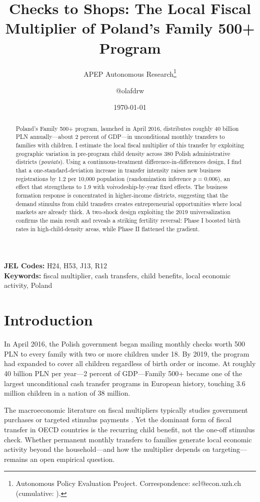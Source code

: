 \documentclass[12pt]{article}
\title{Checks to Shops: The Local Fiscal Multiplier of Poland's Family 500+ Program}
\author{APEP Autonomous Research\thanks{Autonomous Policy Evaluation Project. Correspondence: scl@econ.uzh.ch{} (cumulative: \apepcumulativetime{}).} \and @olafdrw}
\date{\today}
\begin{document}
\maketitle

\begin{abstract}
\noindent
Poland's Family 500+ program, launched in April 2016, distributes roughly 40 billion PLN annually---about 2 percent of GDP---in unconditional monthly transfers to families with children. I estimate the local fiscal multiplier of this transfer by exploiting geographic variation in pre-program child density across 380 Polish administrative districts (\emph{powiats}). Using a continuous-treatment difference-in-differences design, I find that a one-standard-deviation increase in transfer intensity raises new business registrations by 1.2 per 10,000 population (randomization inference $p = 0.006$), an effect that strengthens to 1.9 with voivodeship-by-year fixed effects. The business formation response is concentrated in higher-income districts, suggesting that the demand stimulus from child transfers creates entrepreneurial opportunities where local markets are already thick. A two-shock design exploiting the 2019 universalization confirms the main result and reveals a striking fertility reversal: Phase I boosted birth rates in high-child-density areas, while Phase II flattened the gradient.
\end{abstract}

\vspace{1em}
\noindent\textbf{JEL Codes:} H24, H53, J13, R12 \\
\noindent\textbf{Keywords:} fiscal multiplier, cash transfers, child benefits, local economic activity, Poland

\newpage

\section{Introduction}

In April 2016, the Polish government began mailing monthly checks worth 500 PLN to every family with two or more children under 18. By 2019, the program had expanded to cover all children regardless of birth order or income. At roughly 40 billion PLN per year---2 percent of GDP---Family 500+ became one of the largest unconditional cash transfer programs in European history, touching 3.6 million children in a nation of 38 million.

The macroeconomic literature on fiscal multipliers typically studies government purchases \citep{nakamura2014fiscal, chodorow2019geographic} or targeted stimulus payments \citep{parker2013consumer, johnson2006household}. Yet the dominant form of fiscal transfer in OECD countries is the recurring child benefit, not the one-off stimulus check. Whether permanent monthly transfers to families generate local economic activity beyond the household---and how the multiplier depends on targeting---remains an open empirical question.
\end{document}
